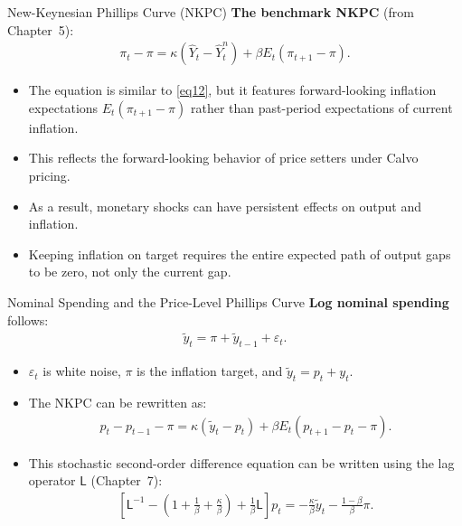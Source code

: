 \documentclass[11pt,aspectratio=169]{beamer}
\begin{document}
\begin{frame}{New-Keynesian Phillips Curve (NKPC)}
\small
\textbf{The benchmark NKPC} (from Chapter~5):
\begin{align}
   \pi _{t}-\pi
   =\kappa (\hat{Y}_{t}-\hat{Y}_{t}^{n})
   +\beta E_{t}(\pi_{t+1}-\pi ).
\label{eq14} 
\end{align}
\begin{itemize}
  \item The equation is similar to \eqref{eq12}, but it features forward-looking inflation expectations \(E_t(\pi_{t+1}-\pi)\) rather than past-period expectations of current inflation.
  \item This reflects the forward-looking behavior of price setters under Calvo pricing.
  \item As a result, monetary shocks can have persistent effects on output and inflation.
  \item Keeping inflation on target requires the entire expected path of output gaps to be zero, not only the current gap.
\end{itemize}
\end{frame}

\begin{frame}{Nominal Spending and the Price-Level Phillips Curve}
\small
\textbf{Log nominal spending} follows:
\begin{align}
    \tilde{y}_{t}=\pi +\tilde{y}_{t-1}+\varepsilon _{t}.
    \label{eq15}
\end{align}
\begin{itemize}
    \item \(\varepsilon_t\) is white noise, \(\pi\) is the inflation target, and \(\tilde y_t=p_t+y_t\).
    \item The NKPC can be rewritten as:
    \begin{align*}
        p_t-p_{t-1}-\pi=\kappa(\tilde y_t-p_t)+\beta E_t(p_{t+1}-p_t-\pi).
    \end{align*}
    \item This stochastic second-order difference equation can be written using the lag operator \(\mathsf{L}\) (Chapter~7):
    \begin{align*}
        \left[ \mathsf{L}^{-1}-\left( 1+\frac{1}{\beta }+\frac{\kappa }{\beta }\right)
        +\frac{1}{\beta }\mathsf{L}\right] p_{t}
        =-\frac{\kappa }{\beta }\tilde{y}_{t}-\frac{1-\beta }{\beta }\pi.
    \end{align*}
\end{itemize}
\end{frame}
\end{document}
